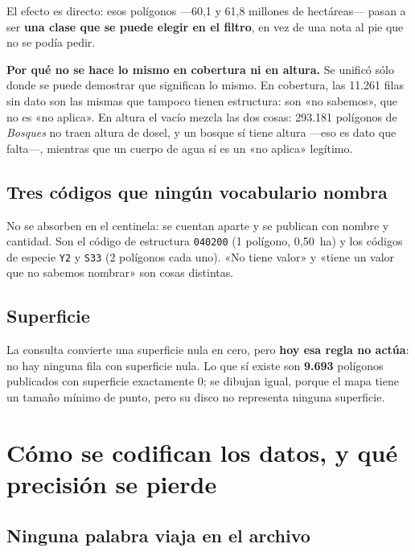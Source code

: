 \documentclass[11pt,a4paper]{report}
\newcommand{\campo}[1]{\textcolor{conaf}{\textbf{#1}}}
\newcommand{\orig}[1]{\texttt{\small #1}}
\begin{document}
El efecto es directo: esos polígonos —60,1 y 61,8 millones de hectáreas— pasan a
ser \campo{una clase que se puede elegir en el filtro}, en vez de una nota al
pie que no se podía pedir.

\begin{nota}
\campo{Por qué no se hace lo mismo en cobertura ni en altura.} Se unificó sólo
donde se puede demostrar que significan lo mismo. En cobertura, las 11.261 filas
sin dato son las mismas que tampoco tienen estructura: son «no sabemos», que no
es «no aplica». En altura el vacío mezcla las dos cosas: 293.181 polígonos de
\emph{Bosques} no traen altura de dosel, y un bosque sí tiene altura —eso es
dato que falta—, mientras que un cuerpo de agua sí es un «no aplica» legítimo.
\end{nota}

\section{Tres códigos que ningún vocabulario nombra}

No se absorben en el centinela: se cuentan aparte y se publican con nombre y
cantidad. Son el código de estructura \orig{040200} (1 polígono, 0,50~ha) y los
códigos de especie \orig{Y2} y \orig{S33} (2 polígonos cada uno). «No tiene
valor» y «tiene un valor que no sabemos nombrar» son cosas distintas.

\section{Superficie}

La consulta convierte una superficie nula en cero, pero \campo{hoy esa regla no
actúa}: no hay ninguna fila con superficie nula. Lo que sí existe son
\textbf{9.693} polígonos publicados con superficie exactamente 0; se dibujan
igual, porque el mapa tiene un tamaño mínimo de punto, pero su disco no
representa ninguna superficie.

\chapter{Cómo se codifican los datos, y qué precisión se pierde}

\section{Ninguna palabra viaja en el archivo}
\end{document}
